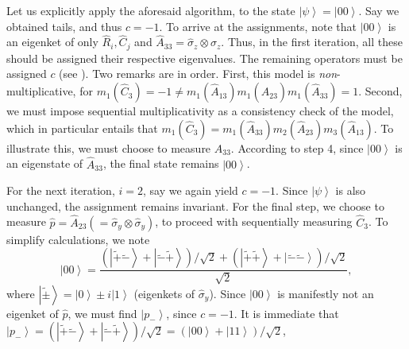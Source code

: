 Let us explicitly apply the aforesaid algorithm, to the state $\left|\psi\right\rangle =\left|00\right\rangle $.
Say we obtained tails, and thus $c=-1$. To arrive at the assignments,
note that $\left|00\right\rangle $ is an eigenket of only $\hat{R}_{i},\hat{C}_{j}$
and $\hat{A}_{33}=\hat{\sigma}_{z}\otimes\hat{\sigma}_{z}$. Thus,
in the first iteration, all these should be assigned their respective
eigenvalues. The remaining operators must be assigned $c$ (see ).
Two remarks are in order. First, this model is \emph{non}-multiplicative,
for $m_{1}(\hat{C}_{3})=-1\neq m_{1}(\hat{A}_{13})m_{1}(\hat{A}_{23})m_{1}(\hat{A}_{33})=1$.
Second, we must impose sequential multiplicativity as a consistency
check of the model, which in particular entails that $m_{1}(\hat{C}_{3})=m_{1}(\hat{A}_{33})m_{2}(\hat{A}_{23})m_{3}(\hat{A}_{13})$.
To illustrate this, we must choose to measure $\hat{A}_{33}$. According
to step 4, since $\left|00\right\rangle $ is an eigenstate of $\hat{A}_{33}$,
the final state remains $\left|00\right\rangle $. %

For the next iteration, $i=2$, say we again yield $c=-1$. Since
$\left|\psi\right\rangle $ is also unchanged, the assignment remains
invariant. For the final step, we choose to measure $\hat{p}=\hat{A}_{23}(=\hat{\sigma}_{y}\otimes\hat{\sigma}_{y})$,
to proceed with sequentially measuring $\hat{C}_{3}$. To simplify
calculations, we note 
\[
\left|00\right\rangle =\frac{(\left|\tilde{+}\tilde{-}\right\rangle +\left|\tilde{-}\tilde{+}\right\rangle )/\sqrt{2}+(\left|\tilde{+}\tilde{+}\right\rangle +\left|\tilde{-}\tilde{-}\right\rangle )/\sqrt{2}}{\sqrt{2}},
\]
where $\left|\tilde{\pm}\right\rangle =\left|0\right\rangle \pm i\left|1\right\rangle $
(eigenkets of $\hat{\sigma}_{y}$). Since $\left|00\right\rangle $
is manifestly not an eigenket of $\hat{p}$, we must find $\left|p_{-}\right\rangle $,
since $c=-1$. It is immediate that $\left|p_{-}\right\rangle =\left(\left|\tilde{+}\tilde{-}\right\rangle +\left|\tilde{-}\tilde{+}\right\rangle \right)/\sqrt{2}=\left(\left|00\right\rangle +\left|11\right\rangle \right)/\sqrt{2}$,
